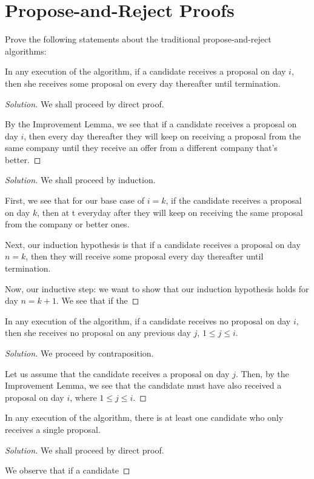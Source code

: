 \documentclass[openany]{book}
\newenvironment{solution}{\begin{proof}[Solution]}{\end{proof}}
\begin{document}
\section{Propose-and-Reject Proofs}
Prove the following statements about the traditional propose-and-reject algorithms:
\begin{hw}
	In any execution of the algorithm, if a candidate receives a proposal on day $i$, then she receives some proposal on every day thereafter until termination.
\end{hw}
\begin{solution}
	We shall proceed by direct proof.
	
	By the Improvement Lemma, we see that if a candidate receives a proposal on day $i$, then every day thereafter they will keep on receiving a proposal from the same company until they receive an offer from a different company that's better.
\end{solution}
\begin{solution}
	We shall proceed by induction.
	
	First, we see that for our base case of $i=k$, if the candidate receives a proposal on day $k$, then at t everyday after they will keep on receiving the same proposal from the company or better ones.
	
	Next, our induction hypothesis is that if a candidate receives a proposal on day $n=k$, then they will receive some proposal every day thereafter until termination.
	
	Now, our inductive step: we want to show that our induction hypothesis holds for day $n=k+1$. We see that if the 
\end{solution}
\begin{hw}
	In any execution of the algorithm, if a candidate receives no proposal on day $i$, then she receives no proposal on any previous day $j$, $1 \leq j \leq i$.
\end{hw}
\begin{solution}
	We proceed by contraposition.
	
	Let us assume that the candidate receives a proposal on day $j$. Then, by the Improvement Lemma, we see that the candidate must have also received a proposal on day $i$, where $1 \leq j \leq i$.
\end{solution}
\begin{hw}
	In any execution of the algorithm, there is at least one candidate who only receives a single proposal.
\end{hw}
\begin{solution}
	We shall proceed by direct proof.
	
	We observe that if a candidate 
\end{solution}
\end{document}
